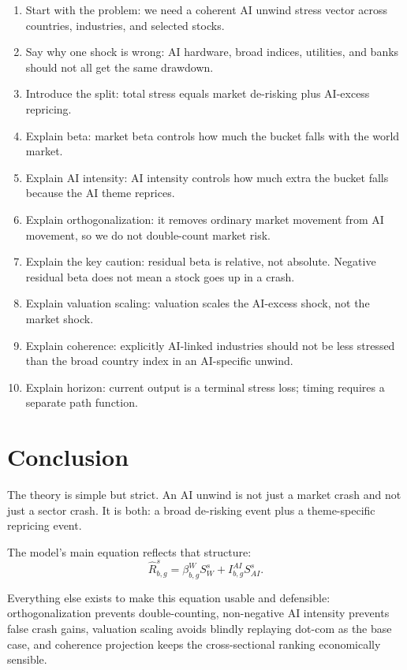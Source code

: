 \documentclass[10pt]{article}
\begin{document}
\begin{enumerate}
\item Start with the problem: we need a coherent AI unwind stress vector across countries, industries, and selected stocks.
\item Say why one shock is wrong: AI hardware, broad indices, utilities, and banks should not all get the same drawdown.
\item Introduce the split: total stress equals market de-risking plus AI-excess repricing.
\item Explain beta: market beta controls how much the bucket falls with the world market.
\item Explain AI intensity: AI intensity controls how much extra the bucket falls because the AI theme reprices.
\item Explain orthogonalization: it removes ordinary market movement from AI movement, so we do not double-count market risk.
\item Explain the key caution: residual beta is relative, not absolute. Negative residual beta does not mean a stock goes up in a crash.
\item Explain valuation scaling: valuation scales the AI-excess shock, not the market shock.
\item Explain coherence: explicitly AI-linked industries should not be less stressed than the broad country index in an AI-specific unwind.
\item Explain horizon: current output is a terminal stress loss; timing requires a separate path function.
\end{enumerate}

\section{Conclusion}

The theory is simple but strict. An AI unwind is not just a market crash and not just a sector crash. It is both: a broad de-risking event plus a theme-specific repricing event.

The model's main equation reflects that structure:
\[
\widehat R_{b,g}^{s}=\beta_{b,g}^{W}S_W^s+I_{b,g}^{AI}S_{AI}^s.
\]

Everything else exists to make this equation usable and defensible: orthogonalization prevents double-counting, non-negative AI intensity prevents false crash gains, valuation scaling avoids blindly replaying dot-com as the base case, and coherence projection keeps the cross-sectional ranking economically sensible.
\end{document}
